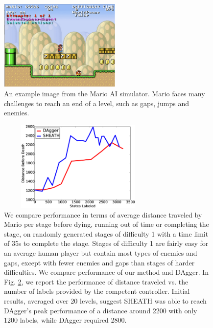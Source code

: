 \documentclass[10pt, conference]{ieeeconf}      %
\begin{document}
\begin{figure}[t!]
\centering
\includegraphics[width = 6cm ]{figures/mario.png}
\caption{ An example image from the Mario AI simulator. Mario faces many challenges to reach an end of a level, such as gaps, jumps and enemies.  }

\vspace*{-10pt}
\label{fig:dis_traveled}
\end{figure}



\begin{figure}[ht]
\centering

\includegraphics[width=8cm, height = 4.5cm]{figures/dagger_sheath_mario.eps}


\caption{We compare performance in terms of average distance traveled by Mario per stage before dying, running out of time or completing the stage, on randomly generated stages of difficulty 1 with a time limit of 35s to complete the stage.  Stages of difficulty 1 are fairly easy for an average human player but contain most types of enemies and gaps, except with fewer enemies and gaps than stages of harder difficulties. We compare performance of our method and DAgger. In Fig. \ref{fig:mario_results}, we report the performance of distance traveled vs. the number of labels provided by the competent controller. Initial results, averaged over 20 levels, suggest SHEATH was able to reach DAgger's peak performance of a distance around 2200 with only 1200 labels, while DAgger required 2800.   }
\label{fig:mario_results}
\end{figure}
\end{document}
